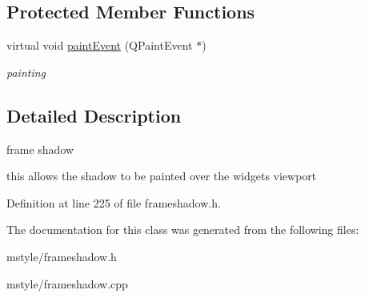 \subsection*{Protected Member Functions}
\begin{DoxyCompactItemize}
\item 
\mbox{\label{class_flat_frame_shadow_a1d181a4f55f898f3f70613fe1bf9307d}} 
virtual void \hyperlink{class_flat_frame_shadow_a1d181a4f55f898f3f70613fe1bf9307d}{paint\+Event} (Q\+Paint\+Event $\ast$)
\begin{DoxyCompactList}\small\item\em painting \end{DoxyCompactList}\end{DoxyCompactItemize}


\subsection{Detailed Description}
frame shadow 

this allows the shadow to be painted over the widgets viewport 

Definition at line 225 of file frameshadow.\+h.



The documentation for this class was generated from the following files\+:\begin{DoxyCompactItemize}
\item 
mstyle/frameshadow.\+h\item 
mstyle/frameshadow.\+cpp\end{DoxyCompactItemize}
